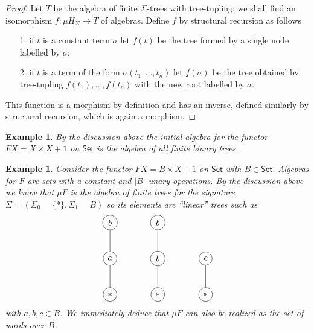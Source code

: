 \documentclass[letterpaper, 11pt, oneside]{memoir}
\theoremstyle{myteo}
\newtheorem{example}[theorem]{Example}
\numberwithin{equation}{section}
\newcommand{\Set}{\textsf{Set}}
\begin{document}
\begin{proof}
  Let \(T\) be the algebra of finite \(\Sigma\)-trees with tree-tupling; we shall find an isomorphism \(f \colon \mu H_\Sigma \to T\) of algebras.
  Define \(f\) by structural recursion as follows
  \begin{itemize}
  \item[1.] if \(t\) is a constant term \(\sigma\) let \(f(t)\) be the tree formed by a single node labelled by \(\sigma\);
  \item[2.] if \(t\) is a term of the form \(\sigma(t_1, \ldots, t_n)\) let \(f(\sigma)\) be the tree obtained by tree-tupling \(f(t_1), \ldots, f(t_n)\) with the new root labelled by \(\sigma\).
  \end{itemize}
  This function is a morphism by definition and has an inverse, defined similarly by structural recursion, which is again a morphism.
\end{proof}

\begin{example}
  \label{ex:finite_binary_trees}
  By the discussion above the initial algebra for the functor \(FX = X \times X + 1\) on \(\Set\) is the algebra of all finite binary trees.
\end{example}

\begin{example}
  Consider the functor \(FX = B \times X + 1\) on \(\Set\) with \(B \in \Set\).
  Algebras for \(F\) are sets with a constant and \(|B|\) unary operations.
  By the discussion above we know that \(\mu F\) is the algebra of finite trees for the signature \(\Sigma = (\Sigma_0 = \{*\}, \Sigma_1 = B)\) so its elements are ``linear'' trees such as
  \begin{equation*}
    \begin{tikzpicture}
      \path
      (0,0) node[circle, draw](x){\(*\)}
      (0,1.5) node[circle, draw](y){\(a\)}
      (0,3) node[circle, draw](z){\(b\)};
      \draw (x) -- (y) -- (z);

      \path
      (2, 0) node[circle, draw](x){\(*\)}
      (2, 1.5) node[circle, draw](y){\(b\)}
      (2, 3) node[circle, draw](z){\(b\)};
      \draw (x) -- (y) -- (z);

      \path
      (4, 0) node[circle, draw](x){\(*\)}
      (4, 1.5) node[circle, draw](y){\(c\)};
      \draw (x) -- (y);
    \end{tikzpicture}
  \end{equation*}
  with \(a, b, c \in B\).
  We immediately deduce that \(\mu F\) can also be realized as the set of words over \(B\).
\end{example}
\end{document}
